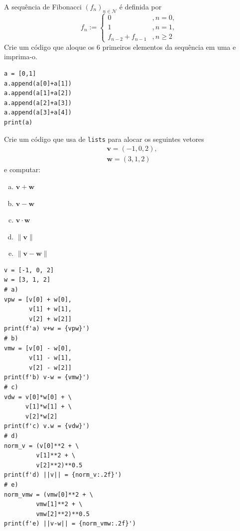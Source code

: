 \begin{exer}
  A sequência de Fibonacci{\fibonacci} $(f_n)_{n\in\mathcal{N}}$ é definida por
  \begin{equation}
    f_n := \left\{
    \begin{array}{ll}
      0 &, n=0,\\
      1 &, n=1,\\
      f_{n-2}+f_{n-1} &, n\geq 2
    \end{array}
  \right. 
\end{equation}
Crie um código que aloque os $6$ primeiros elementos da sequência em uma {\PYTHONlist} e imprima-o.
\end{exer}
\begin{resp}

\begin{lstlisting}
a = [0,1]
a.append(a[0]+a[1])
a.append(a[1]+a[2])
a.append(a[2]+a[3])
a.append(a[3]+a[4])
print(a)
\end{lstlisting}

\end{resp}

\begin{exer}
  Crie um código que usa de \texttt{lists} para alocar os seguintes vetores
  \begin{align}
    & \pmb{v} = (-1, 0, 2), \\
    & \pmb{w} = (3, 1, 2)
  \end{align}
  e computar:
  \begin{enumerate}[a)]
  \item $\pmb{v} + \pmb{w}$
  \item $\pmb{v} - \pmb{w}$
  \item $\pmb{v}\cdot \pmb{w}$
  \item $\|\pmb{v}\|$
  \item $\|\pmb{v} - \pmb{w}\|$
  \end{enumerate}
\end{exer}
\begin{resp}

\begin{lstlisting}
v = [-1, 0, 2]
w = [3, 1, 2]
# a)
vpw = [v[0] + w[0],
       v[1] + w[1],
       v[2] + w[2]]
print(f'a) v+w = {vpw}')
# b)
vmw = [v[0] - w[0],
       v[1] - w[1],
       v[2] - w[2]]
print(f'b) v-w = {vmw}')
# c)
vdw = v[0]*w[0] + \
      v[1]*w[1] + \
      v[2]*w[2]
print(f'c) v.w = {vdw}')
# d)
norm_v = (v[0]**2 + \
         v[1]**2 + \
         v[2]**2)**0.5
print(f'd) ||v|| = {norm_v:.2f}')
# e)
norm_vmw = (vmw[0]**2 + \
         vmw[1]**2 + \
         vmw[2]**2)**0.5
print(f'e) ||v-w|| = {norm_vmw:.2f}')
\end{lstlisting}

\end{resp}

